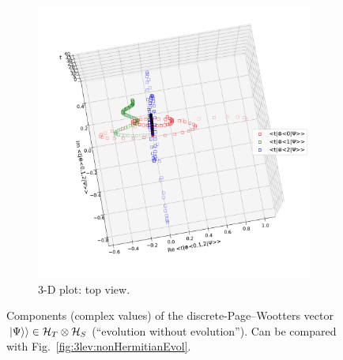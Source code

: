\begin{figure}[]
\begin{subfigure}[b]{\textwidth}
    \includegraphics[height=0.48\textheight,clip,trim= 0 60 0 100]{img/3ldetect/PWSpaceTime_top.pdf}
    \caption{3-D plot: top view.}
  \end{subfigure}
  \caption[
    Components (complex values) of $\dket{\Psi} \in \pwspace$
  ]{
    Components (complex values) of the discrete-Page--Wootters vector
    $\dket{\Psi} \in \pwspace$
    (``evolution without evolution'').
    Can be compared with Fig.~\ref{fig:3lev:nonHermitianEvol}.
  }
  \label{fig:3lev:PWSpaceTime}
\end{figure}

